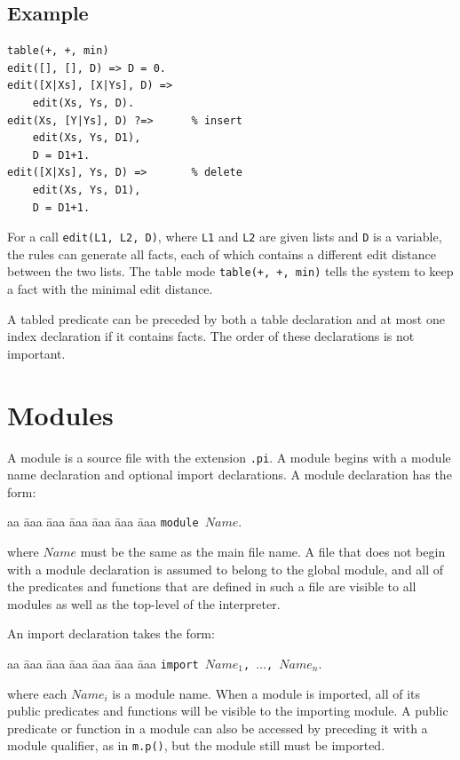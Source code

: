 \subsection*{Example}
\begin{verbatim}
table(+, +, min)
edit([], [], D) => D = 0.
edit([X|Xs], [X|Ys], D) =>   
    edit(Xs, Ys, D).
edit(Xs, [Y|Ys], D) ?=>      % insert
    edit(Xs, Ys, D1),
    D = D1+1.
edit([X|Xs], Ys, D) =>       % delete
    edit(Xs, Ys, D1),
    D = D1+1.
\end{verbatim}
For a call \texttt{edit(L1, L2, D)}, where \texttt{L1} and \texttt{L2} are given lists and \texttt{D} is a variable, the rules can generate all facts, each of which contains a different edit distance between the two lists. The table mode \texttt{table(+, +, min)} tells the system to keep a fact with the minimal edit distance. 

A tabled predicate can be preceded by both a table declaration and at most one index declaration if it contains facts. The order of these declarations is not important.

\section{Modules}
A module is a source file with the extension \texttt{.pi}. A module begins with a module name declaration and optional import declarations. A module declaration has the form: 
\begin{tabbing}
aa \= aaa \= aaa \= aaa \= aaa \= aaa \= aaa \kill
\> \texttt{module $Name$}.
\end{tabbing}
where $Name$ must be the same as the main file name. A file that does not begin with a module declaration is assumed to belong to the global module, and all of the predicates and functions that are defined in such a file are visible to all modules as well as the top-level of the interpreter. 

An import declaration takes the form: 
\begin{tabbing}
aa \= aaa \= aaa \= aaa \= aaa \= aaa \= aaa \kill
\> \texttt{import $Name_1$, $\ldots$, $Name_n$}.
\end{tabbing}
where each $Name_i$ is a module name. When a module is imported, all of its public predicates and functions will be visible to the importing module. A public predicate or function in a module can also be accessed by preceding it with a module qualifier, as in \texttt{m.p()}, but the module still must be imported.

